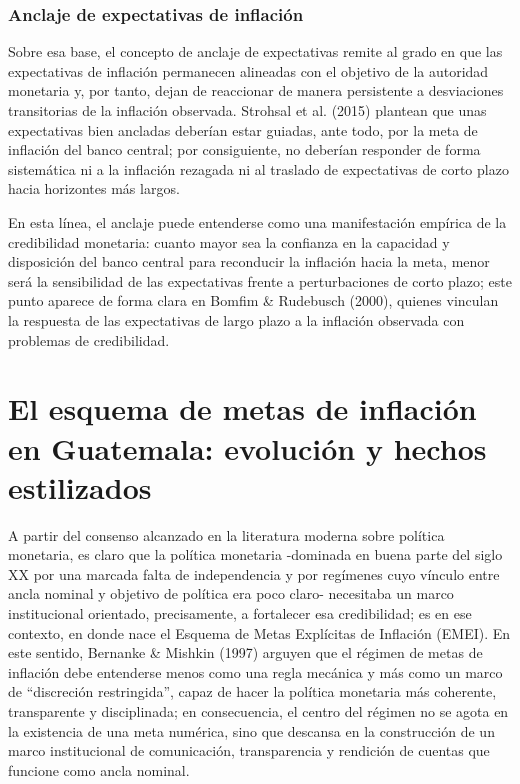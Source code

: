 \documentclass[
  10.5pt,
  letterpaper,
  twocolumn]{article}
\begin{document}
\subsubsection{Anclaje de expectativas de
inflación}\label{anclaje-de-expectativas-de-inflaciuxf3n}

Sobre esa base, el concepto de anclaje de expectativas remite al grado
en que las expectativas de inflación permanecen alineadas con el
objetivo de la autoridad monetaria y, por tanto, dejan de reaccionar de
manera persistente a desviaciones transitorias de la inflación
observada. Strohsal et al. (2015) plantean que unas expectativas bien
ancladas deberían estar guiadas, ante todo, por la meta de inflación del
banco central; por consiguiente, no deberían responder de forma
sistemática ni a la inflación rezagada ni al traslado de expectativas de
corto plazo hacia horizontes más largos.

En esta línea, el anclaje puede entenderse como una manifestación
empírica de la credibilidad monetaria: cuanto mayor sea la confianza en
la capacidad y disposición del banco central para reconducir la
inflación hacia la meta, menor será la sensibilidad de las expectativas
frente a perturbaciones de corto plazo; este punto aparece de forma
clara en Bomfim \& Rudebusch (2000), quienes vinculan la respuesta de
las expectativas de largo plazo a la inflación observada con problemas
de credibilidad.

\section{El esquema de metas de inflación en Guatemala: evolución y
hechos
estilizados}\label{el-esquema-de-metas-de-inflaciuxf3n-en-guatemala-evoluciuxf3n-y-hechos-estilizados}

A partir del consenso alcanzado en la literatura moderna sobre política
monetaria, es claro que la política monetaria -dominada en buena parte
del siglo XX por una marcada falta de independencia y por regímenes cuyo
vínculo entre ancla nominal y objetivo de política era poco claro-
necesitaba un marco institucional orientado, precisamente, a fortalecer
esa credibilidad; es en ese contexto, en donde nace el Esquema de Metas
Explícitas de Inflación (EMEI). En este sentido, Bernanke \& Mishkin
(1997) arguyen que el régimen de metas de inflación debe entenderse
menos como una regla mecánica y más como un marco de ``discreción
restringida'', capaz de hacer la política monetaria más coherente,
transparente y disciplinada; en consecuencia, el centro del régimen no
se agota en la existencia de una meta numérica, sino que descansa en la
construcción de un marco institucional de comunicación, transparencia y
rendición de cuentas que funcione como ancla nominal.
\end{document}
